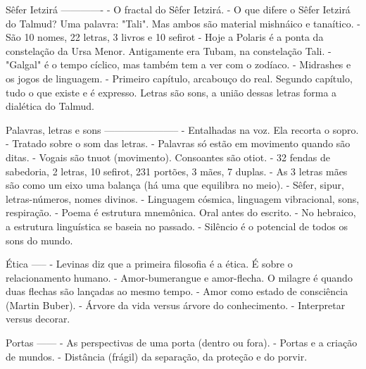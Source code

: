 Sêfer Ietzirá
-------------
- O fractal do Sêfer Ietzirá.
- O que difere o Sêfer Ietzirá do Talmud? Uma palavra: "Tali". Mas ambos são material mishnáico e tanaítico.
- São 10 nomes, 22 letras, 3 livros e 10 sefirot
- Hoje a Polaris é a ponta da constelação da Ursa Menor. Antigamente era Tubam, na constelação Tali.
- "Galgal" é o tempo cíclico, mas também tem a ver com o zodíaco.
- Midrashes e os jogos de linguagem.
- Primeiro capítulo, arcabouço do real. Segundo capítulo, tudo o que existe e é expresso. Letras são sons, a união dessas letras forma a dialética do Talmud.

Palavras, letras e sons
-----------------------
- Entalhadas na voz. Ela recorta o sopro.
- Tratado sobre o som das letras.
- Palavras só estão em movimento quando são ditas.
- Vogais são tnuot (movimento). Consoantes são otiot.
- 32 fendas de sabedoria, 2 letras, 10 sefirot, 231 portões, 3 mães, 7 duplas.
- As 3 letras mães são como um eixo uma balança (há uma que equilibra no meio).
- Sêfer, sipur, letras-números, nomes divinos.
- Linguagem cósmica, linguagem vibracional, sons, respiração.
- Poema é estrutura mnemônica. Oral antes do escrito.
- No hebraico, a estrutura linguística se baseia no passado.
- Silêncio é o potencial de todos os sons do mundo.

Ética
-----
- Levinas diz que a primeira filosofia é a ética. É sobre o relacionamento humano.
- Amor-bumerangue e amor-flecha. O milagre é quando duas flechas são lançadas ao mesmo tempo.
- Amor como estado de consciência (Martin Buber).
- Árvore da vida versus árvore do conhecimento.
- Interpretar versus decorar.

Portas
------
- As perspectivas de uma porta (dentro ou fora).
- Portas e a criação de mundos.
- Distância (frágil) da separação, da proteção e do porvir.